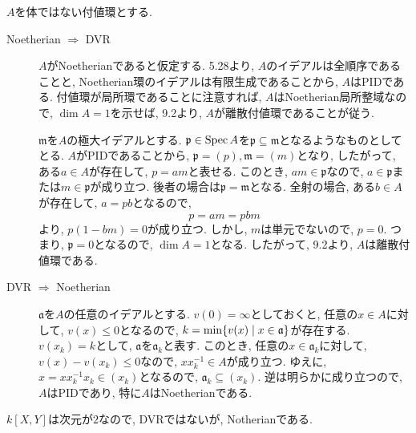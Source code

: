 \documentclass[dvipdfmx]{jsarticle}
\begin{document}
    \begin{problem}
        $A$を体ではない付値環とする.
        \begin{description}
            \item[\rm Noetherian $\Rightarrow$ DVR]
                $A$がNoetherianであると仮定する.
                5.28より, $A$のイデアルは全順序であることと, Noetherian環のイデアルは有限生成であることから,
                $A$はPIDである.
                付値環が局所環であることに注意すれば,
                $A$はNoetherian局所整域なので, $\dim{A} = 1$を示せば, 9.2より, $A$が離散付値環であることが従う.

                $\mathfrak{m}$を$A$の極大イデアルとする.
                $\mathfrak{p} \in \operatorname{Spec}{A}$を$\mathfrak{p} \subseteq \mathfrak{m}$となるようなものとしてとる.
                $A$がPIDであることから, $\mathfrak{p} = (p), \mathfrak{m} = (m)$となり,
                したがって, ある$a \in A$が存在して, $p = am$と表せる.
                このとき, $am \in \mathfrak{p}$なので, $a \in \mathfrak{p}$または$m \in \mathfrak{p}$が成り立つ.
                後者の場合は$\mathfrak{p} = \mathfrak{m}$となる.
                全射の場合, ある$b \in A$が存在して, $a = pb$となるので,
                \[
                    p = am = pbm
                \]
                より, $p(1-bm) = 0$が成り立つ.
                しかし, $m$は単元でないので, $p = 0$.
                つまり, $\mathfrak{p} = 0$となるので, $\dim{A} = 1$となる.
                したがって, 9.2より, $A$は離散付値環である.
            \item[\rm DVR $\Rightarrow$ Noetherian]
                $\mathfrak{a}$を$A$の任意のイデアルとする.
                $v(0) = \infty$としておくと,
                任意の$x \in A$に対して, $v(x) \leq 0$となるので,
                $k = \min\{v(x) \mid x\in \mathfrak{a}\}$が存在する.
                $v(x_k) = k$として, $\mathfrak{a}$を$\mathfrak{a}_k$と表す.
                このとき, 任意の$x \in \mathfrak{a}_k$に対して,
                $v(x)-v(x_k) \leq 0$なので, $xx_k^{-1} \in A$が成り立つ.
                ゆえに,  $x = xx_k^{-1}x_k \in (x_k)$となるので, $\mathfrak{a}_k \subseteq (x_k)$.
                逆は明らかに成り立つので, $A$はPIDであり, 特に$A$はNoetherianである.
        \end{description}
    \end{problem}

    \begin{note}
        $k[X, Y]$は次元が$2$なので, DVRではないが, Notherianである.
    \end{note}
\end{document}
